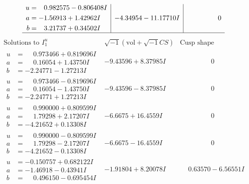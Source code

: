 \documentclass[1p]{elsarticle_modified}
\theoremstyle{definition}
\newcommand{\I}{\sqrt{-1}}
\begin{document}
$$\begin{array}{c|c|c}
\begin{aligned}
u &= \phantom{-}0.982575 - 0.806408 I \\
a &= -1.56913 + 1.42962 I \\
b &= \phantom{-}3.21737 + 0.34502 I\end{aligned}
 & -4.34954 - 11.17710 I & \phantom{-0.000000 } 0\\
 \hline 
 \end{array}$$\newpage$$\begin{array}{c|c|c}  
\text{Solutions to }I^u_{1}& \I (\text{vol} + \sqrt{-1}CS) & \text{Cusp shape}\\
 \hline 
\begin{aligned}
u &= \phantom{-}0.973466 + 0.819696 I \\
a &= \phantom{-}0.16054 + 1.43750 I \\
b &= -2.24771 - 1.27213 I\end{aligned}
 & -9.43596 + 8.37985 I & \phantom{-0.000000 } 0 \\ \hline\begin{aligned}
u &= \phantom{-}0.973466 - 0.819696 I \\
a &= \phantom{-}0.16054 - 1.43750 I \\
b &= -2.24771 + 1.27213 I\end{aligned}
 & -9.43596 - 8.37985 I & \phantom{-0.000000 } 0 \\ \hline\begin{aligned}
u &= \phantom{-}0.990000 + 0.809599 I \\
a &= \phantom{-}1.79298 + 2.17207 I \\
b &= -4.21652 + 0.13308 I\end{aligned}
 & -6.6675 + 16.4559 I & \phantom{-0.000000 } 0 \\ \hline\begin{aligned}
u &= \phantom{-}0.990000 - 0.809599 I \\
a &= \phantom{-}1.79298 - 2.17207 I \\
b &= -4.21652 - 0.13308 I\end{aligned}
 & -6.6675 - 16.4559 I & \phantom{-0.000000 } 0 \\ \hline\begin{aligned}
u &= -0.150757 + 0.682122 I \\
a &= -1.46918 - 0.43941 I \\
b &= \phantom{-}0.496150 - 0.695454 I\end{aligned}
 & -1.91804 + 8.20078 I & \phantom{-}0.63570 - 6.56551 I \\ \hline\begin{aligned}

\end{aligned}
\end{array}$$
\end{document}

